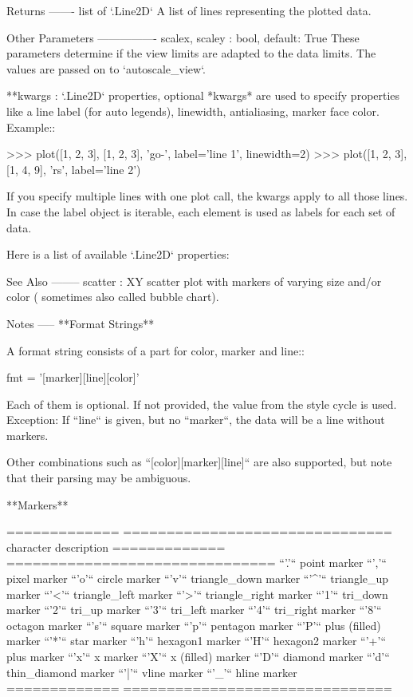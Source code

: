 \begin{DoxyVerb}
\begin{DoxyVerb}
Returns
-------
list of `.Line2D`
    A list of lines representing the plotted data.

Other Parameters
----------------
scalex, scaley : bool, default: True
    These parameters determine if the view limits are adapted to the
    data limits. The values are passed on to `autoscale_view`.

**kwargs : `.Line2D` properties, optional
    *kwargs* are used to specify properties like a line label (for
    auto legends), linewidth, antialiasing, marker face color.
    Example::

    >>> plot([1, 2, 3], [1, 2, 3], 'go-', label='line 1', linewidth=2)
    >>> plot([1, 2, 3], [1, 4, 9], 'rs', label='line 2')

    If you specify multiple lines with one plot call, the kwargs apply
    to all those lines. In case the label object is iterable, each
    element is used as labels for each set of data.

    Here is a list of available `.Line2D` properties:


See Also
--------
scatter : XY scatter plot with markers of varying size and/or color (
    sometimes also called bubble chart).

Notes
-----
**Format Strings**

A format string consists of a part for color, marker and line::

    fmt = '[marker][line][color]'

Each of them is optional. If not provided, the value from the style
cycle is used. Exception: If ``line`` is given, but no ``marker``,
the data will be a line without markers.

Other combinations such as ``[color][marker][line]`` are also
supported, but note that their parsing may be ambiguous.

**Markers**

=============   ===============================
character       description
=============   ===============================
``'.'``         point marker
``','``         pixel marker
``'o'``         circle marker
``'v'``         triangle_down marker
``'^'``         triangle_up marker
``'<'``         triangle_left marker
``'>'``         triangle_right marker
``'1'``         tri_down marker
``'2'``         tri_up marker
``'3'``         tri_left marker
``'4'``         tri_right marker
``'8'``         octagon marker
``'s'``         square marker
``'p'``         pentagon marker
``'P'``         plus (filled) marker
``'*'``         star marker
``'h'``         hexagon1 marker
``'H'``         hexagon2 marker
``'+'``         plus marker
``'x'``         x marker
``'X'``         x (filled) marker
``'D'``         diamond marker
``'d'``         thin_diamond marker
``'|'``         vline marker
``'_'``         hline marker
=============   ===============================


\end{DoxyVerb}
\end{DoxyVerb}
